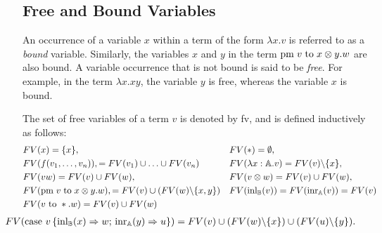 


\subsection{Free and Bound Variables}
An occurrence of a variable $x$ within a term of the form $\lambda x.v$ is referred to as a \emph{bound} variable.  Similarly, the variables $x$ and $y$ in the term $\text{pm} \hspace{3 pt} v \hspace{3 pt} \text{to} \hspace{3 pt} x \otimes y. w$ are also bound. A variable occurrence that is not bound is said to be \emph{free}. For example, in the term $\lambda x.xy$, the variable $y$ is free, whereas the variable $x$ is bound.  

The set of free variables of a term $v$ is denoted by \gls{fv}, and is defined inductively as follows:
\begin{equation*}
\begin{split}
&FV(x) = \{x\}, &&  FV(*) = \emptyset,  \\
&FV(f(v_1, \ldots, v_n)), = FV(v_1) \cup \ldots \cup FV(v_n)&& FV(\lambda x: \mathbb{A}. v) = FV(v) \backslash \{x\}, \\
&FV(v w) = FV(v) \cup FV(w), && FV(v \otimes w) = FV(v) \cup FV(w), \\
& FV(\text{pm} \hspace{3 pt} v \hspace{3 pt} \text{to} \hspace{3 pt} x \otimes y. w), = FV(v) \cup (FV(w)  \backslash \{x,y\}) &&  FV(\text{inl}_{\mathbb{B}} (v)) =  FV(\text{inr}_{\mathbb{A}} (v)) = FV(v)\\
&FV(v \text{ to } *.w) = FV(v) \cup FV(w)  &&   \\
\end{split}
\end{equation*}
\vspace{-18pt}
\vspace{1pt}
\begin{equation*}
  \begin{split}
& \hspace{-30pt} FV(\text{case } v \,   \{\text{inl}_{\typeB} (x) \Rightarrow w ; \, \text{inr}_{\typeA} (y) \Rightarrow u\}) = FV(v) \cup  (FV(w) \backslash \{x\}) \cup (FV(u)\backslash \{y\}).
\end{split}
\end{equation*}

